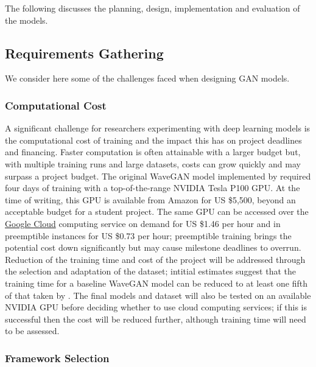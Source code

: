 \documentclass[a4paper, dvipsnames, titlepage]{article}
\begin{document}
The following discusses the planning, design, implementation and evaluation of the models.

\subsection{Requirements Gathering}

We consider here some of the challenges faced when designing GAN models.

\subsubsection{Computational Cost}

A significant challenge for researchers experimenting with deep learning models is the computational cost of training and the impact this has on project deadlines and financing.
Faster computation is often attainable with a larger budget but, with multiple training runs and large datasets, costs can grow quickly and may surpass a project budget.
\newline
\newline
The original WaveGAN model implemented by \citeauthor{2018arXiv180204208D} required four days of training with a top-of-the-range NVIDIA Tesla P100 GPU.
At the time of writing, this GPU is available from Amazon for US \$5,500, beyond an acceptable budget for a student project.
The same GPU can be accessed over the \href{https://cloud.google.com/gpu/}{Google Cloud} computing service on demand for US \$1.46 per hour and in preemptible instances for US \$0.73 per hour; preemptible training brings the potential cost down significantly but may cause milestone deadlines to overrun.
\newline
\newline
Reduction of the training time and cost of the project will be addressed through the selection and adaptation of the dataset; intitial estimates suggest that the training time for a baseline WaveGAN model can be reduced to at least one fifth of that taken by \citeauthor{2018arXiv180204208D}.
The final models and dataset will also be tested on an available NVIDIA GPU before deciding whether to use cloud computing services; if this is successful then the cost will be reduced further, although training time will need to be assessed.

\subsubsection{Framework Selection}
\end{document}
